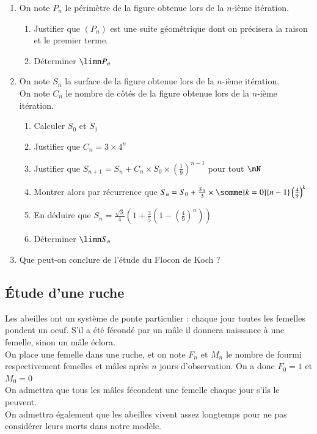 \documentclass[oneside,12pt]{article}          %
\begin{document}
\begin{enumerate}
    \item On note $P_n$ le périmètre de la figure obtenue lors de la $n$-ième itération.
    \begin{enumerate}
        \item Justifier que $(P_n)$ est une suite géométrique dont on précisera la raison et le premier terme.
        \item Déterminer $\limn P_n$
    \end{enumerate}
    \item On note $S_n$ la surface de la figure obtenue lors de la $n$-ième itération.\\
            On note $C_n$ le nombre de côtés de la figure obtenue lors de la $n$-ième itération.
    \begin{enumerate}
        \item Calculer $S_0$ et $S_1$
        \item Justifier que $C_n=3\times4^n$
        \item Justifier que $S_{n+1}=S_n+C_n\times S_0\times\left(\frac{1}{9}\right)^{n-1}$ pour tout $\nN$
        \item Montrer alors par récurrence que $S_n=S_0+\frac{S_0}{3}\times\somme{k=0}{n-1}\left(\frac{4}{9}\right)^k$
        \item En déduire que $S_n=\frac{\sqrt{3}}{4}\left(1+\frac{3}{5}\left(1-\left(\frac{4}{9}\right)^n\right)\right)$
        \item Déterminer $\limn S_n$
    \end{enumerate}
    \item Que peut-on conclure de l'étude du Flocon de Koch ?
\end{enumerate}



\subsection{Étude d'une ruche}
Les abeilles ont un système de ponte particulier : chaque jour toutes les femelles pondent un oeuf. S'il a été fécondé par un mâle il donnera naissance à une femelle, sinon un mâle éclora.\\[5pt]
On place une femelle dans une ruche, et on note $F_n$ et $M_n$ le nombre de fourmi respectivement femelles et mâles après $n$ jours d'observation. On a donc $F_0=1$ et $M_0=0$\\[5pt]
On admettra que tous les mâles fécondent une femelle chaque jour s'ils le peuvent.\\
On admettra également que les abeilles vivent assez longtemps pour ne pas considérer leurs morts dans notre modèle.
\end{document}
